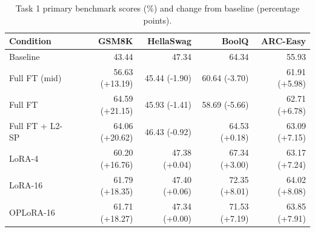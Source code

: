 \begin{table}[t]
\centering\small
\begin{tabular}{lrrrr}
\toprule
Condition & GSM8K & HellaSwag & BoolQ & ARC-Easy \\
\midrule
Baseline & 43.44 & 47.34 & 64.34 & 55.93 \\
Full FT (mid) & 56.63 (+13.19) & 45.44 (-1.90) & 60.64 (-3.70) & 61.91 (+5.98) \\
Full FT & 64.59 (+21.15) & 45.93 (-1.41) & 58.69 (-5.66) & 62.71 (+6.78) \\
Full FT + L2-SP & 64.06 (+20.62) & 46.43 (-0.92) & 64.53 (+0.18) & 63.09 (+7.15) \\
LoRA-4 & 60.20 (+16.76) & 47.38 (+0.04) & 67.34 (+3.00) & 63.17 (+7.24) \\
LoRA-16 & 61.79 (+18.35) & 47.40 (+0.06) & 72.35 (+8.01) & 64.02 (+8.08) \\
OPLoRA-16 & 61.71 (+18.27) & 47.34 (+0.00) & 71.53 (+7.19) & 63.85 (+7.91) \\
\bottomrule
\end{tabular}
\caption{Task 1 primary benchmark scores (\%) and change from baseline (percentage points).}
\label{tab:task1_benchmarks}
\end{table}
